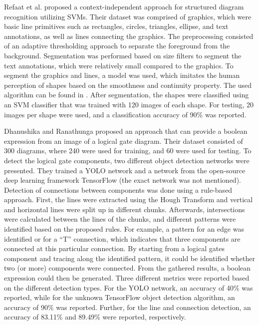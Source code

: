 Refaat et al. \cite{ecd_ctxindependentsvm} proposed a context-independent approach for structured diagram recognition utilizing \acp{SVM}.
Their dataset was comprised of graphics, which were basic line primitives such as rectangles, circles, triangles, ellipse, and text annotations, as well as lines connecting the graphics.
The preprocessing consisted of an adaptive thresholding approach to separate the foreground from the background.
Segmentation was performed based on size filters to segment the text annotations, which were relatively small compared to the graphics.
To segment the graphics and lines, a model was used, which imitates the human perception of shapes based on the smoothness and continuity property.
The used algorithm can be found in \cite{line_primitive}.
After segmentation, the shapes were classified using an \ac{SVM} classifier that was trained with 120 images of each shape.
For testing, 20 images per shape were used, and a classification accuracy of 90\% was reported.

Dhanushika and Ranathunga \cite{ecd_yolobool} proposed an approach that can provide a boolean expression from an image of a logical gate diagram.
Their dataset consisted of 300 diagrams, where 240 were used for training, and 60 were used for testing.
To detect the logical gate components, two different object detection networks were presented.
They trained a \ac{YOLO} network and a network from the open-source deep learning framework TensorFlow \cite{tensorflow} (the exact network was not mentioned).
Detection of connections between components was done using a rule-based approach.
First, the lines were extracted using the Hough Transform \cite{hough_transform} and vertical and horizontal lines were split up in different chunks.
Afterwards, intersections were calculated between the lines of the chunks, and different patterns were identified based on the proposed rules.
For example, a pattern for an edge was identified or for a ``T'' connection, which indicates that three components are connected at this particular connection.
By starting from a logical gates component and tracing along the identified pattern, it could be identified whether two (or more) components were connected.
From the gathered results, a boolean expression could then be generated.
Three different metrics were reported based on the different detection types.
For the \ac{YOLO} network, an accuracy of 40\%  was reported, while for the unknown TensorFlow object detection algorithm, an accuracy of 90\% was reported.
Further, for the line and connection detection, an accuracy of 83.11\% and 89.49\% were reported, respectively.

